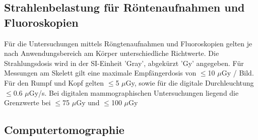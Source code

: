\subsection{Strahlenbelastung für Röntenaufnahmen und Fluoroskopien}
\label{subsec:Strahlenbelastung}

Für die Untersuchungen mittels Röngtenaufnahmen und Fluoroskopien gelten je nach Anwendungsbereich am Körper unterschiedliche 
Richtwerte. Die Strahlungsdosis wird in der SI-Einheit 'Gray', abgekürzt 'Gy' angegeben. Für Messungen am Skelett gilt eine maximale
Empfängerdosis von $\leq$10 $\mu$Gy / Bild. Für den Rumpf und Kopf gelten $\leq$5 $\mu$Gy, sowie für die digitale Durchleuchtung $\leq$0.6 
 $\mu$Gy/s. Bei digitalen mammographischen Untersuchungen liegend die Grenzwerte bei $\leq$75 $\mu$Gy und $\leq$100 $\mu$Gy




\subsection{Computertomographie}
\label{sec:CT}





